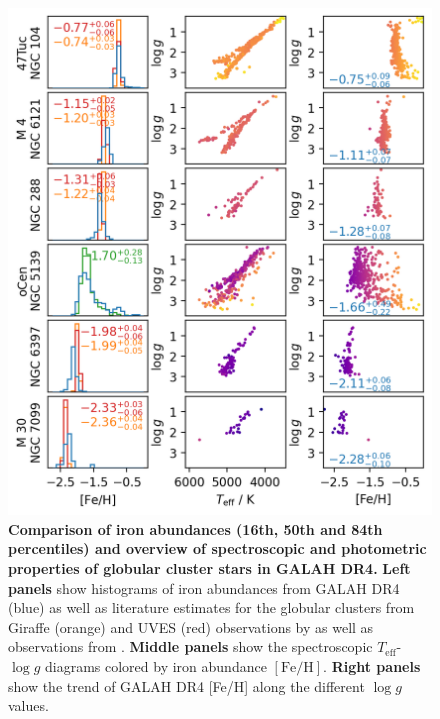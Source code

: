 \documentclass[
  journal=pasa,
  manuscript=research-paper, %
  year=2024,
  volume=37
]{cup-journal}
\newcommand{\Teff}{$T_\mathrm{eff}$\xspace}
\newcommand{\logg}{$\log g$\xspace}
\newcommand{\feh}{$\mathrm{[Fe/H]}$\xspace}
\begin{document}
\begin{figure}[ht]
 \centering
 \includegraphics[width=\columnwidth]{figures/galah_dr4_allstar_globular_cluster_feh_comparison.png}
 \caption{\textbf{Comparison of iron abundances (16th, 50th and 84th percentiles) and overview of spectroscopic and photometric properties of globular cluster stars in GALAH DR4.}
 \textbf{Left panels} show histograms of iron abundances from GALAH DR4 (blue) as well as literature estimates for the globular clusters from Giraffe (orange) and UVES (red) observations by \citep{Carretta2009c, Carretta2009} as well as observations from \cite{Johnson2010}.
 \textbf{Middle panels} show the spectroscopic \Teff-\logg diagrams colored by iron abundance \feh.
 \textbf{Right panels} show the trend of GALAH DR4 [Fe/H] along the different \logg values.
}
 \label{fig:galah_dr4_allstar_globular_cluster_feh_comparison}
\end{figure}
\end{document}
